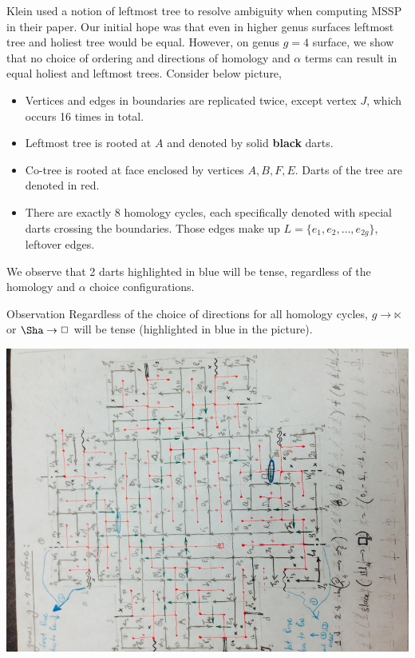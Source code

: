 \documentclass{article}
\begin{document}
Klein \cite{klein2005multiple} used a notion of leftmost tree to resolve ambiguity when 
computing MSSP in their paper.
Our initial hope was that even in higher genus surfaces leftmost tree and holiest
tree would be equal. However, on genus $g = 4$ surface, we show that no
choice of ordering and directions of homology and $\alpha$ terms can result in equal holiest and
leftmost trees. Consider below picture, \\
\begin{itemize}
\item Vertices and edges in boundaries are replicated twice, except vertex $J$, which occurs 16 times in total.
\item Leftmost tree is rooted at $A$ and denoted by solid \textbf{black} darts.
\item {\color{red} Co-tree} is rooted at face enclosed by vertices $A, B, F, E$. Darts of the tree are denoted in red.
\item There are exactly 8 homology cycles, each specifically denoted with
special darts crossing the boundaries. Those edges make up $L = \{e_1, e_2, \ldots, e_{2g}\}$, leftover edges.
\end{itemize}
We observe that 2 darts highlighted in blue will be tense, 
regardless of the homology and $\alpha$ choice configurations.
\begin{oneshot}{Observation}
Regardless of the choice of directions for all homology cycles, $g \rightarrow \ltimes$ or 
$\Sha \rightarrow \square$ will be tense (highlighted in {\color{blue} blue} in the picture). 
\end{oneshot}

\begin{center}
\includegraphics[angle = -90, scale = 0.7]{figures/Genus4_InitialHolyTree.jpg}
\end{center}
\end{document}
